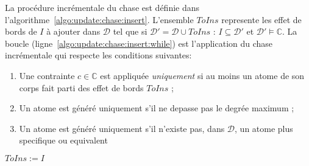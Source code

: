 La procédure incrémentale du \gls{chase} est définie dans l'algorithme~\ref{algo:update:chase:insert}.
L'ensemble $ToIns$ represente les effet de bords de $I$ à ajouter dans $\mathcal{D}$ tel que si $\mathcal{D}' = \mathcal{D} \cup ToIns$ : $I \subseteq \mathcal{D}'$ et $\mathcal{D}' \vDash \mathbb{C}$.
La boucle (ligne~\ref{algo:update:chase:insert:while}) est l'application du \gls{chase} incrémentale qui respecte les conditions suivantes:
\begin{enumerate}[label=(\arabic*),ref=(\arabic*)]
    \item Une contrainte $c \in \mathbb{C}$ est appliquée \textit{uniquement} si au moins un atome de son corps fait parti des effet de bords $ToIns$  \label{algo:update:chase:insert:c1} ;
    \item Un atome est généré uniquement s'il ne depasse pas le degrée maximum \label{algo:update:chase:insert:c2} ;
    \item Un atome est généré uniquement s'il n'existe pas, dans $\mathcal{D}$, un atome plus specifique ou equivalent \label{algo:update:chase:insert:c3}
\end{enumerate}

\begin{algorithm}[ht]
    \caption{$\textsc{Chase4Insert}(\mathcal{D}, \mathbb{C}, \delta_{max}, I)$}
    \label{algo:update:chase:insert}
    $ToIns := I$ \;
     \;
\end{algorithm}

